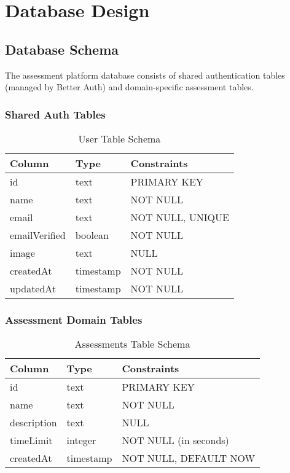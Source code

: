 \documentclass[12pt,a4paper]{report}
\begin{document}
\chapter{Database Design}

\section{Database Schema}

The assessment platform database consists of shared authentication tables (managed by Better Auth) and domain-specific assessment tables.

\subsection{Shared Auth Tables}

\begin{table}[H]
\centering
\caption{User Table Schema}
\begin{tabular}{@{}lll@{}}
\toprule
\textbf{Column} & \textbf{Type} & \textbf{Constraints} \\ \midrule
id & text & PRIMARY KEY \\
name & text & NOT NULL \\
email & text & NOT NULL, UNIQUE \\
emailVerified & boolean & NOT NULL \\
image & text & NULL \\
createdAt & timestamp & NOT NULL \\
updatedAt & timestamp & NOT NULL \\ \bottomrule
\end{tabular}
\end{table}

\subsection{Assessment Domain Tables}

\begin{table}[H]
\centering
\caption{Assessments Table Schema}
\begin{tabular}{@{}lll@{}}
\toprule
\textbf{Column} & \textbf{Type} & \textbf{Constraints} \\ \midrule
id & text & PRIMARY KEY \\
name & text & NOT NULL \\
description & text & NULL \\
timeLimit & integer & NOT NULL (in seconds) \\
createdAt & timestamp & NOT NULL, DEFAULT NOW \\ \bottomrule
\end{tabular}
\end{table}
\end{document}
